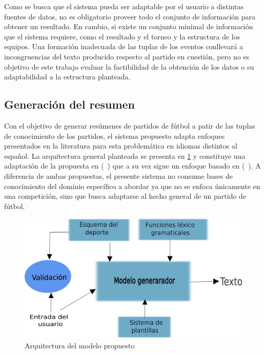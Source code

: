     Como se busca que el sistema pueda ser adaptable por el usuario a distintas fuentes de datos, no es obligatorio proveer todo el conjunto de información para 
obtener un resultado. En cambio, si existe un conjunto minimal de información que el sistema requiere, como el resultado y el torneo y la estructura de los equipos. 
Una formación inadecuada de las tuplas de los eventos conllevará a incongruencias del texto producido respecto al partido en cuestión, pero no es objetivo de 
este trabajo evaluar la factibilidad de la obtención de los datos o su adaptabilidad a la estructura planteada.


\subsection{Generación del resumen}

    Con el objetivo de generar resúmenes de partidos de fútbol a patir de las tuplas de conocimiento de los partidos, el sistema propuesto adapta enfoques presentados 
en la literatura para esta problemática en idiomas distintos al español. La arquitectura general planteada se presenta en \ref{arquitecturadelmodelo} y constituye una 
adaptación de la propuesta en (~\cite{aires2016automatic}) que a su vez sigue un enfoque basado en (~\cite{theune2001data}). A diferencia de ambas propuestas, el 
presente sistema no consume bases de conocimiento del dominio específico a abordar ya que no se enfoca únicamente en una competición, sino que busca adaptarse al hecho 
general de un partido de fútbol. 


\begin{figure}[!]
    \begin{center}
        \includegraphics[scale=0.9]{Graphics/arquitecturaprop2.png}
    \end{center}
    \caption{Arquitectura del modelo propuesto}
    \label{arquitecturadelmodelo}
\end{figure}

